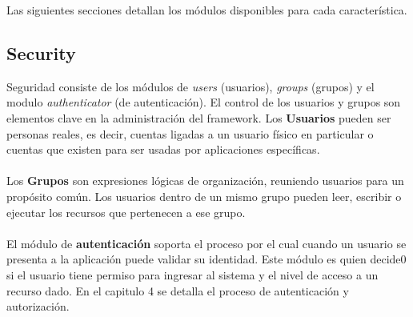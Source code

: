 Las siguientes secciones detallan los módulos disponibles para cada característica. 

\subsection{Security}
Seguridad consiste de los módulos de \emph{users} (usuarios), \emph{groups} (grupos) y el modulo \emph{authenticator} (de autenticación). El control de los usuarios y grupos son elementos clave en la administración del framework. Los \textbf{Usuarios} pueden ser personas reales, es decir, cuentas ligadas a un usuario físico en particular o cuentas que existen para ser usadas por aplicaciones específicas. \\
\\
Los \textbf{Grupos} son expresiones lógicas de organización, reuniendo usuarios para un propósito común. Los usuarios dentro de un mismo grupo pueden leer, escribir o ejecutar los recursos que pertenecen a ese grupo.\\
\\
El módulo de \textbf{autenticación} soporta el proceso por el cual cuando un usuario se presenta a la aplicación puede validar su identidad. Este módulo es quien decide0 si el usuario tiene permiso para ingresar al sistema y el nivel de acceso a un recurso dado. En el capitulo 4 se detalla el proceso de autenticación y autorización.

